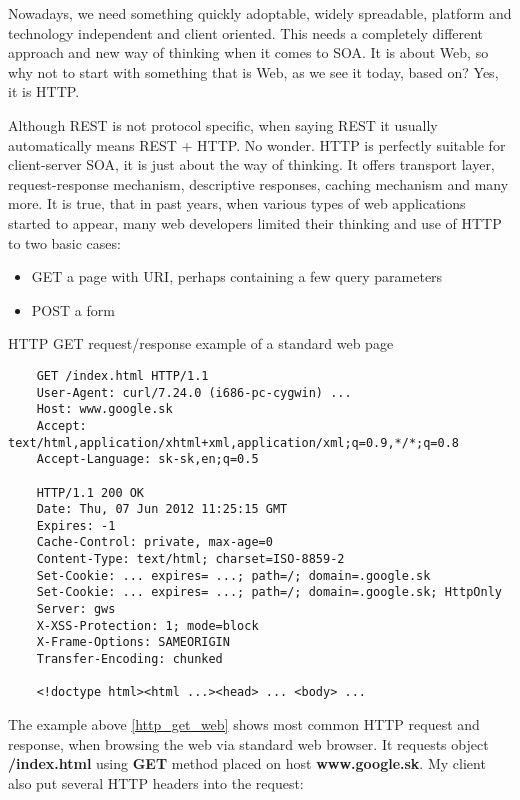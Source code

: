 	Nowadays, we need something quickly adoptable, widely spreadable, platform and technology independent and client
	oriented. This needs a completely different approach and new way of thinking when it comes to \gls{SOA}. It is about
	Web, so why not to start with something that is Web, as we see it today, based on? Yes, it is \gls{HTTP}.
	
	Although \gls{REST} is not protocol specific, when saying \gls{REST} it usually automatically means \gls{REST} +
	\gls{HTTP}. No wonder. \gls{HTTP} is perfectly suitable for client-server \gls{SOA}, it is just about the way of
	thinking. It offers transport layer, request-response mechanism, descriptive responses, caching mechanism and many
	more. It is true, that in past years, when various types of web applications started to appear, many web developers
	limited their thinking and use of \gls{HTTP} to two basic cases:
	
	\begin{itemize}
	  \item GET a page with \gls{URI}, perhaps containing a few query parameters
	  \item POST a form
	\end{itemize}
	
	\begin{program}
	\caption{HTTP GET request/response example of a standard web page}\label{http_get_web}
	\begin{verbatim}
	GET /index.html HTTP/1.1
	User-Agent: curl/7.24.0 (i686-pc-cygwin) ...
	Host: www.google.sk
	Accept: text/html,application/xhtml+xml,application/xml;q=0.9,*/*;q=0.8
	Accept-Language: sk-sk,en;q=0.5

	HTTP/1.1 200 OK
	Date: Thu, 07 Jun 2012 11:25:15 GMT
	Expires: -1
	Cache-Control: private, max-age=0
	Content-Type: text/html; charset=ISO-8859-2
	Set-Cookie: ... expires= ...; path=/; domain=.google.sk
	Set-Cookie: ... expires= ...; path=/; domain=.google.sk; HttpOnly
	Server: gws
	X-XSS-Protection: 1; mode=block
	X-Frame-Options: SAMEORIGIN
	Transfer-Encoding: chunked

	<!doctype html><html ...><head> ... <body> ...
	\end{verbatim}
	\end{program}
	
	The example above \ref{http_get_web} shows most common HTTP request and response, when browsing the web via standard
	web browser. It requests object \textbf{/index.html} using \textbf{GET} method placed on host \textbf{www.google.sk}.
	My client also put several HTTP headers into the request:
	
